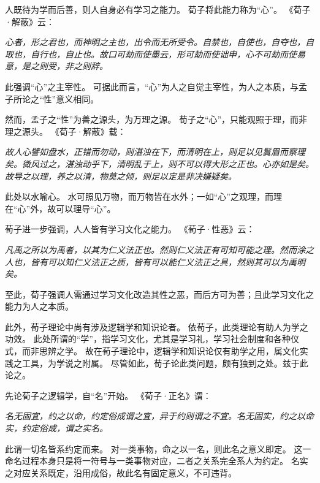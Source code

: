\documentclass[11pt]{article}
\begin{document}
人既待为学而后善，则人自身必有学习之能力。
荀子将此能力称为“心”。
《荀子·解蔽》云：

\textit{心者，形之君也，而神明之主也，出令而无所受令。自禁也，自使也，自夺也，自取也，自行也，自止也。故口可劫而使墨云，形可劫而使诎申，心不可劫而使易意，是之则受，非之则辞。}

此强调“心”之主宰性。
可据此而言，“心”为人之自觉主宰性，为人之本质，与孟子所论之“性”意义相同。

\par

然而，孟子之“性”为善之源头，为万理之源。
荀子之“心”，只能观照于理，而非理之源头。
《荀子·解蔽》载：

\textit{故人心譬如盘水，正错而勿动，则湛浊在下，而清明在上，则足以见鬒眉而察理矣。微风过之，湛浊动乎下，清明乱于上，则不可以得大形之正也。心亦如是矣。故导之以理，养之以清，物莫之倾，则足以定是非决嫌疑矣。}

此处以水喻心。
水可照见万物，而万物皆在水外；一如“心”之观理，而理在“心”外，故可以理导“心”。

\par

荀子进一步强调，人人皆有学习文化之能力。
《荀子·性恶》云：

\textit{凡禹之所以为禹者，以其为仁义法正也。然则仁义法正有可知可能之理。然而涂之人也，皆有可以知仁义法正之质，皆有可以能仁义法正之具，然则其可以为禹明矣。}

至此，荀子强调人需通过学习文化改造其性之恶，而后方可为善；且此学习文化之能力为人之本质。

\par

此外，荀子理论中尚有涉及逻辑学和知识论者。
依荀子，此类理论有助人为学之功效。
此处所谓的“学”，指学习文化，尤其是学习礼，学习社会制度和各种仪式，而非思辨之学。
故在荀子理论中，逻辑学和知识论仅有助学之用，属文化实践之工具，为学说之附属。
尽管如此，荀子论此类问题，颇有独到之处。兹于此论之。

\par

先论荀子之逻辑学，自“名”开始。
《荀子·正名》谓：

\textit{名无固宜，约之以命，约定俗成谓之宜，异于约则谓之不宜。名无固实，约之以命实，约定俗成，谓之实名。}

此谓一切名皆系约定而来。
对一类事物，命之以一名，则此名之意义即定。
这一命名过程本身只是将一符号与一类事物对应，二者之关系完全系人为约定。
名实之对应关系既定，沿用成俗，故此名有固定意义，不可违背。

\par
\end{document}
